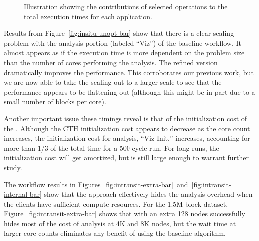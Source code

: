 \begin{figure}[htbp]
\begin{centering}
\vspace{-24pt}

\vspace{-24pt}

\vspace{-24pt}

\caption[Breakdown of operation timings.]{Illustration showing the
contributions of selected operations to the total execution times for each
application.} 
\label{fig:runtime-individual-bar}
\end{centering}
\end{figure}


Results from Figure~\ref{fig:insitu-unopt-bar} show that there is a clear
scaling problem with the analysis portion (labeled ``Viz'') of the baseline
\insitu workflow.  It almost appears as if the execution time is more
dependent on the problem size than the number of cores performing the analysis.
The refined version dramatically improves the performance.  This
corroborates our previous work, but we are now able to
take the scaling out to a larger scale to see that the performance appears
to be flattening out (although this might be in part due to a small number
of blocks per core).

Another important issue these timings reveal is that of the initialization
cost of the \vda.  Although the CTH initialization cost appears to decrease
as the core count increases, the initialization cost for analysis, ``Viz
Init,'' increases, accounting for more than 1/3 of the total time for a
500-cycle run.  For long runs, the initialization cost will get amortized,
but is still large enough to warrant further study.

The \intransit workflow results in
Figures~\ref{fig:intransit-extra-bar}~and~\ref{fig:intransit-internal-bar}
show that the \intransit approach effectively hides the analysis overhead
when the clients have sufficient compute resources.  For the 1.5M block
dataset, Figure~\ref{fig:intransit-extra-bar} shows that \intransit with an
extra 128 nodes successfully hides most of the cost of analysis at 4K and 8K
nodes, but the wait time at larger core counts eliminates any benefit of
\intransit using the baseline algorithm.

